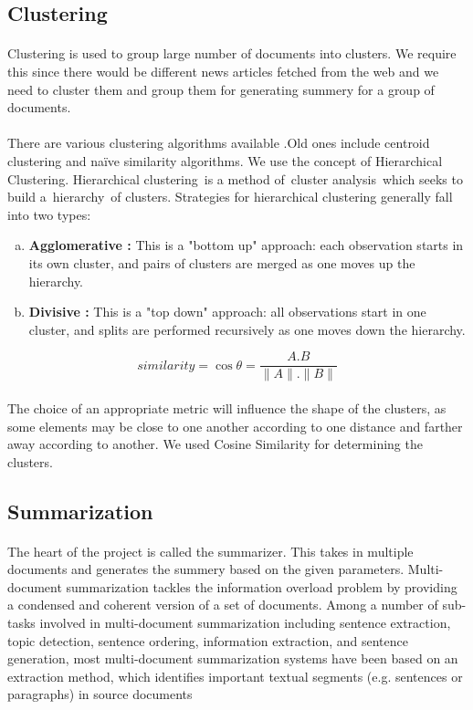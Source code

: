 \subsection{Clustering}
\paragraph{} Clustering is used to group large number of documents into clusters. We require this since there would be different news articles fetched from the web and we need to cluster them and group them for generating summery for a group of documents.
\paragraph{}	There are various clustering algorithms available .Old ones include centroid clustering and naïve similarity algorithms. We use the concept of Hierarchical Clustering. Hierarchical clustering is a method of cluster analysis which seeks to build a hierarchy of clusters. Strategies for hierarchical clustering generally fall into two types:
\begin{enumerate}[a. ]
\item \textbf{Agglomerative :} This is a "bottom up" approach: each observation starts in its own cluster, and pairs of clusters are merged as one moves up the hierarchy.
\item \textbf{Divisive :} This is a "top down" approach: all observations start in one cluster, and splits are performed recursively as one moves down the hierarchy.
\end{enumerate}
\begin{equation}
similarity = \cos{\theta} = \frac{A.B}{\|A\|.\|B\|}
\end{equation}
\paragraph{}The choice of an appropriate metric will influence the shape of the clusters, as some elements may be close to one another according to one distance and farther away according to another. We used Cosine Similarity for determining the clusters.
\subsection{Summarization}
\paragraph{} The heart of the project is called the summarizer. This takes in multiple documents and generates the summery based on the given parameters. Multi-document summarization tackles the information overload problem by providing a condensed and coherent version of a set of documents. Among a number of sub-tasks involved in multi-document summarization including sentence extraction, topic detection, sentence ordering, information extraction, and sentence generation, most multi-document summarization systems have been based on an extraction method, which identifies important textual segments (e.g. sentences or paragraphs) in source documents

